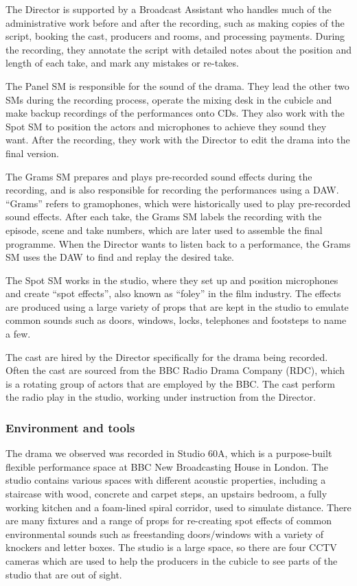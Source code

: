 The Director is supported by a Broadcast Assistant who handles much of the administrative work before and after the
recording, such as making copies of the script, booking the cast, producers and rooms, and processing payments.
During the recording, they annotate the script with detailed notes about the position and length of each take, and mark
any mistakes or re-takes.

The Panel SM is responsible for the sound of the drama. They lead the other two SMs during the recording process,
operate the mixing desk in the cubicle and make backup recordings of the performances onto CDs.  They also work with
the Spot SM to position the actors and microphones to achieve they sound they want.  After the recording, they work
with the Director to edit the drama into the final version.

The Grams SM prepares and plays pre-recorded sound effects during the recording, and is also responsible for recording
the performances using a DAW.  ``Grams'' refers to gramophones, which were historically used to play pre-recorded sound
effects.  After each take, the Grams SM labels the recording with the episode, scene and take numbers, which are later
used to assemble the final programme.  When the Director wants to listen back to a performance, the Grams SM uses the
DAW to find and replay the desired take.

The Spot SM works in the studio, where they set up and position microphones and create ``spot effects'', also known as
``foley'' in the film industry. The effects are produced using a large variety of props that are kept in the studio to
emulate common sounds such as doors, windows, locks, telephones and footsteps to name a few.

The cast are hired by the Director specifically for the drama being recorded. Often the cast are sourced from the BBC
Radio Drama Company (RDC), which is a rotating group of actors that are employed by the BBC. The cast perform the
radio play in the studio, working under instruction from the Director.

\subsubsection{Environment and tools}

The drama we observed was recorded in Studio 60A, which is a purpose-built flexible performance space at BBC New
Broadcasting House in London. The studio contains various spaces with different acoustic properties, including a
staircase with wood, concrete and carpet steps, an upstairs bedroom, a fully working kitchen and a foam-lined spiral
corridor, used to simulate distance.  There are many fixtures and a range of props for re-creating spot effects of
common environmental sounds such as freestanding doors/windows with a variety of knockers and letter boxes. The studio
is a large space, so there are four CCTV cameras which are used to help the producers in the cubicle to see parts of
the studio that are out of sight. 

